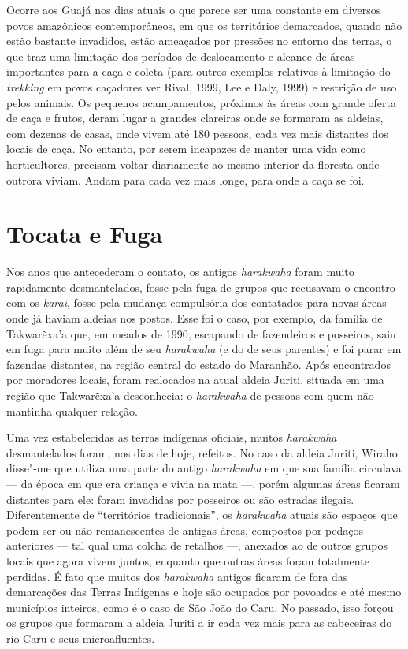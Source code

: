 Ocorre aos Guajá nos dias atuais o que parece ser uma constante em
diversos povos amazônicos contemporâneos, em que os territórios
demarcados, quando não estão bastante invadidos, estão ameaçados por
pressões no entorno das terras, o que traz uma limitação dos períodos de
deslocamento e alcance de áreas importantes para a caça e coleta (para
outros exemplos relativos à limitação do \emph{trekking} em povos
caçadores ver Rival, 1999, Lee e Daly, 1999) e restrição de uso pelos
animais. Os pequenos acampamentos, próximos às áreas com grande oferta
de caça e frutos, deram lugar a grandes clareiras onde se formaram as
aldeias, com dezenas de casas, onde vivem até 180 pessoas, cada vez mais
distantes dos locais de caça. No entanto, por serem incapazes de manter
uma vida como horticultores, precisam voltar diariamente ao mesmo
interior da floresta onde outrora viviam. Andam para cada vez mais
longe, para onde a caça se foi.

\section{Tocata e Fuga}

Nos anos que antecederam o contato, os antigos \emph{harakwaha} foram
muito rapidamente desmantelados, fosse pela fuga de grupos que recusavam
o encontro com os \emph{karai}, fosse pela mudança compulsória dos
contatados para novas áreas onde já haviam aldeias nos postos. Esse foi
o caso, por exemplo, da família de Takwarẽxa'a que, em meados de 1990,
escapando de fazendeiros e posseiros, saiu em fuga para muito além de
seu \emph{harakwaha} (e do de seus parentes) e foi parar em fazendas
distantes, na região central do estado do Maranhão. Após encontrados por
moradores locais, foram realocados na atual aldeia Juriti, situada em
uma região que Takwarẽxa'a desconhecia: o \emph{harakwaha} de pessoas
com quem não mantinha qualquer relação.

Uma vez estabelecidas as terras indígenas oficiais, muitos
\emph{harakwaha} desmantelados foram, nos dias de hoje, refeitos. No
caso da aldeia Juriti, Wiraho disse"-me que utiliza
uma parte do antigo \emph{harakwaha} em que sua família circulava --- da
época em que era criança e vivia na mata ---, porém algumas áreas ficaram
distantes para ele: foram invadidas por posseiros ou são estradas
ilegais. Diferentemente de ``territórios tradicionais'', os
\emph{harakwaha} atuais são espaços que podem ser ou não remanescentes
de antigas áreas, compostos por pedaços anteriores --- tal qual uma colcha
de retalhos ---, anexados ao de outros grupos locais que agora vivem
juntos, enquanto que outras áreas foram totalmente perdidas. É fato que
muitos dos \emph{harakwaha} antigos ficaram de fora das demarcações das
Terras Indígenas e hoje são ocupados por povoados e até mesmo municípios
inteiros, como é o caso de São João do Caru. No passado, isso forçou os
grupos que formaram a aldeia Juriti a ir cada vez mais para as
cabeceiras do rio Caru e seus microafluentes.


